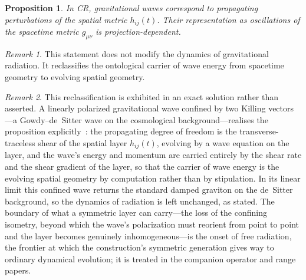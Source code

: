 \documentclass[11pt,a4paper]{article}
\theoremstyle{plain}
\newtheorem{proposition}{Proposition}
\theoremstyle{definition}
\theoremstyle{remark}
\newtheorem{remark}{Remark}
\begin{document}
\begin{proposition}
In CR, gravitational waves correspond to propagating perturbations of the spatial metric $h_{ij}(t)$. Their representation as oscillations of the spacetime metric $g_{\mu\nu}$ is projection-dependent.
\end{proposition}

\begin{remark}
This statement does not modify the dynamics of gravitational radiation. It reclassifies the ontological carrier of wave energy from spacetime geometry to evolving spatial geometry.
\end{remark}

\begin{remark}
This reclassification is exhibited in an exact solution rather than asserted. A linearly polarized gravitational wave confined by two Killing vectors---a Gowdy--de~Sitter wave on the cosmological background---realises the proposition explicitly~\cite{JanzenDynamics}: the propagating degree of freedom is the transverse-traceless shear of the spatial layer $h_{ij}(t)$, evolving by a wave equation on the layer, and the wave's energy and momentum are carried entirely by the shear rate and the shear gradient of the layer, so that the carrier of wave energy is the evolving spatial geometry by computation rather than by stipulation. In its linear limit this confined wave returns the standard damped graviton on the de~Sitter background, so the dynamics of radiation is left unchanged, as stated. The boundary of what a symmetric layer can carry---the loss of the confining isometry, beyond which the wave's polarization must reorient from point to point and the layer becomes genuinely inhomogeneous---is the onset of free radiation, the frontier at which the construction's symmetric generation gives way to ordinary dynamical evolution; it is treated in the companion operator and range papers.
\end{remark}
\end{document}
